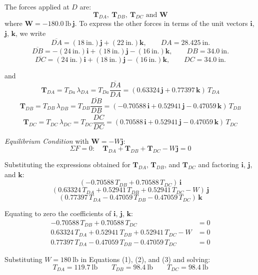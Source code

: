 \documentclass[12pt,a3paper]{article}
\begin{document}
\begin{enumerate}
\begin{tcolorbox}[enhanced,breakable,ansbox,colback=cD!4,colframe=cD,
  boxrule=0.8pt,arc=5pt,
  title={\textbf{Solution}},fonttitle=\bfseries\color{white},
  colbacktitle=cD]
The forces applied at $D$ are:
\[
  \mathbf{T}_{DA},\ \mathbf{T}_{DB},\ \mathbf{T}_{DC} \text{ and } \mathbf{W}
\]
where $\mathbf{W} = -180.0\ \text{lb}\,\mathbf{j}$. To express the other forces in terms of the unit vectors $\mathbf{i}$, $\mathbf{j}$, $\mathbf{k}$, we write
\[
  \overline{DA} = (18\ \text{in.})\mathbf{j} + (22\ \text{in.})\mathbf{k}, \qquad DA = 28.425\ \text{in.}
\]
\[
  \overline{DB} = -(24\ \text{in.})\mathbf{i} + (18\ \text{in.})\mathbf{j} - (16\ \text{in.})\mathbf{k}, \qquad DB = 34.0\ \text{in.}
\]
\[
  \overline{DC} = (24\ \text{in.})\mathbf{i} + (18\ \text{in.})\mathbf{j} - (16\ \text{in.})\mathbf{k}, \qquad DC = 34.0\ \text{in.}
\]

and
\[
  \mathbf{T}_{DA} = T_{Da}\,\lambda_{DA} = T_{Da}\frac{\overline{DA}}{DA}
  = (0.63324\,\mathbf{j} + 0.77397\,\mathbf{k})\,T_{DA}
\]
\[
  \mathbf{T}_{DB} = T_{DB}\,\lambda_{DB} = T_{DB}\frac{\overline{DB}}{DB}
  = (-0.70588\,\mathbf{i} + 0.52941\,\mathbf{j} - 0.47059\,\mathbf{k})\,T_{DB}
\]
\[
  \mathbf{T}_{DC} = T_{DC}\,\lambda_{DC} = T_{DC}\frac{\overline{DC}}{DC}
  = (0.70588\,\mathbf{i} + 0.52941\,\mathbf{j} - 0.47059\,\mathbf{k})\,T_{DC}
\]

\textit{Equilibrium Condition} with $\mathbf{W} = -W\mathbf{j}$:
\[
  \Sigma F = 0\colon \quad \mathbf{T}_{DA} + \mathbf{T}_{DB} + \mathbf{T}_{DC} - W\mathbf{j} = 0
\]

Substituting the expressions obtained for $\mathbf{T}_{DA}$, $\mathbf{T}_{DB}$, and $\mathbf{T}_{DC}$ and factoring $\mathbf{i}$, $\mathbf{j}$, and $\mathbf{k}$:
\[
  (-0.70588\,T_{DB} + 0.70588\,T_{DC})\,\mathbf{i}
\]
\[
  (0.63324\,T_{DA} + 0.52941\,T_{DB} + 0.52941\,T_{DC} - W)\,\mathbf{j}
\]
\[
  (0.77397\,T_{DA} - 0.47059\,T_{DB} - 0.47059\,T_{DC})\,\mathbf{k}
\]

Equating to zero the coefficients of $\mathbf{i}$, $\mathbf{j}$, $\mathbf{k}$:
\begin{align}
  -0.70588\,T_{DB} + 0.70588\,T_{DC} &= 0 \tag{1}\\
  0.63324\,T_{DA} + 0.52941\,T_{DB} + 0.52941\,T_{DC} - W &= 0 \tag{2}\\
  0.77397\,T_{DA} - 0.47059\,T_{DB} - 0.47059\,T_{DC} &= 0 \tag{3}
\end{align}

Substituting $W = 180\ \text{lb}$ in Equations (1), (2), and (3) and solving:
\[
  T_{DA} = 119.7\ \text{lb} \qquad T_{DB} = 98.4\ \text{lb} \qquad T_{DC} = 98.4\ \text{lb}
\]

\end{tcolorbox}


\end{enumerate}
\end{document}
